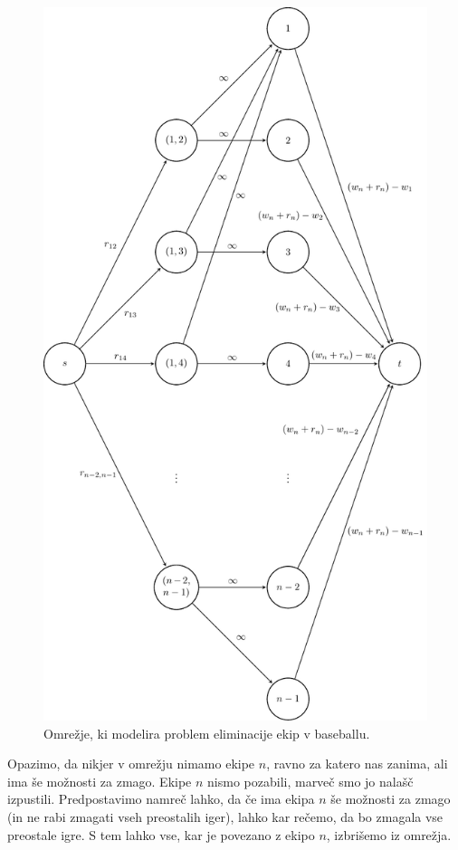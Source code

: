 \documentclass[mat1]{fmfdelo}
\begin{document}
\begin{figure}
  \centering
  \includegraphics[scale=0.9]{images/baseball1.pdf}
  \caption{Omrežje, ki modelira problem eliminacije ekip v baseballu.}
  \label{fig:baseball}
\end{figure}

Opazimo, da nikjer v omrežju nimamo ekipe $n$, ravno za katero nas zanima, ali ima še možnosti za zmago. Ekipe $n$ nismo pozabili, marveč smo jo nalašč izpustili. Predpostavimo
namreč lahko, da če ima ekipa $n$ še možnosti za zmago (in ne rabi zmagati vseh preostalih iger), lahko kar rečemo, da bo zmagala vse preostale igre. S tem lahko vse, kar je povezano z ekipo $n$, izbrišemo iz omrežja.\\
\end{document}
